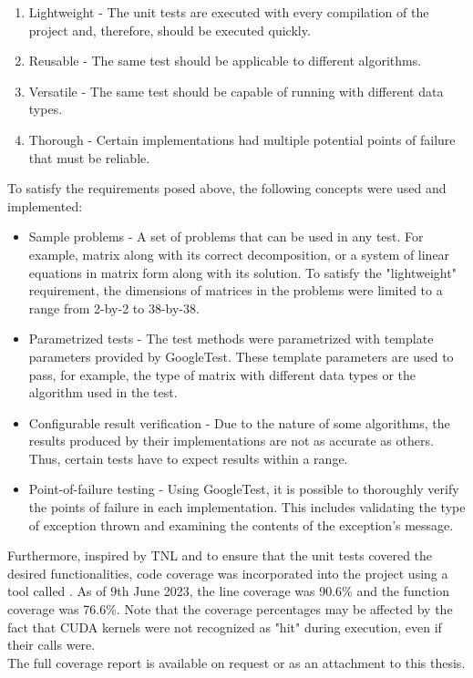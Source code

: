 \begin{enumerate}
	\item Lightweight - The unit tests are executed with every compilation of the project and, therefore, should be executed quickly.
	\item Reusable - The same test should be applicable to different algorithms.
	\item Versatile - The same test should be capable of running with different data types.
	\item Thorough - Certain implementations had multiple potential points of failure that must be reliable.
\end{enumerate}

To satisfy the requirements posed above, the following concepts were used and implemented:

\begin{itemize}
	\item Sample problems - A set of problems that can be used in any test. For example, matrix  along with its correct decomposition, or a system of linear equations in matrix form along with its solution. To satisfy the "lightweight" requirement, the dimensions of matrices in the problems were limited to a range from 2-by-2 to 38-by-38.
	\item Parametrized tests - The test methods were parametrized with template parameters provided by GoogleTest. These template parameters are used to pass, for example, the type of matrix with different data types or the algorithm used in the test.
	\item Configurable result verification - Due to the nature of some algorithms, the results produced by their implementations are not as accurate as others. Thus, certain tests have to expect results within a range.
	\item Point-of-failure testing - Using GoogleTest, it is possible to thoroughly verify the points of failure in each implementation. This includes validating the type of exception thrown and examining the contents of the exception's message.
\end{itemize}

Furthermore, inspired by TNL and to ensure that the unit tests covered the desired functionalities, code coverage was incorporated into the project using a tool called  \cite{Cox2023}. As of 9th June 2023, the line coverage was 90.6\% and the function coverage was 76.6\%. Note that the coverage percentages may be affected by the fact that CUDA kernels were not recognized as "hit" during execution, even if their calls were.\\
The full coverage report is available on request or as an attachment to this thesis.



